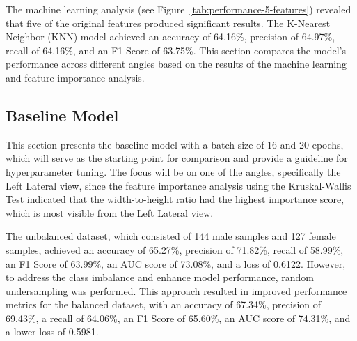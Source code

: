 The machine learning analysis (see Figure~\ref{tab:performance-5-features}) revealed that five of the original features produced significant results. The K-Nearest Neighbor (KNN) model achieved an accuracy of 64.16\%, precision of 64.97\%, recall of 64.16\%, and an F1 Score of 63.75\%. This section compares the model's performance across different angles based on the results of the machine learning and feature importance analysis.

\subsection{Baseline Model}
This section presents the baseline model with a batch size of 16 and 20 epochs, which will serve as the starting point for comparison and provide a guideline for hyperparameter tuning. The focus will be on one of the angles, specifically the Left Lateral view, since the feature importance analysis using the Kruskal-Wallis Test indicated that the width-to-height ratio had the highest importance score, which is most visible from the Left Lateral view.

\vspace{0.5cm}
\begin{table}[H]
	\centering
	\caption{Performance metrics for unbalanced vs. balanced datasets (Batch Size: 16, Epochs: 20).}
	\label{tab:unbalanced-balanced}
\end{table}

The unbalanced dataset, which consisted of 144 male samples and 127 female samples, achieved an accuracy of 65.27\%, precision of 71.82\%, recall of 58.99\%, an F1 Score of 63.99\%, an AUC score of 73.08\%, and a loss of 0.6122. However, to address the class imbalance and enhance model performance, random undersampling was performed. This approach resulted in improved performance metrics for the balanced dataset, with an accuracy of 67.34\%, precision of 69.43\%, a recall of 64.06\%, an F1 Score of 65.60\%, an AUC score of 74.31\%, and a lower loss of 0.5981.

